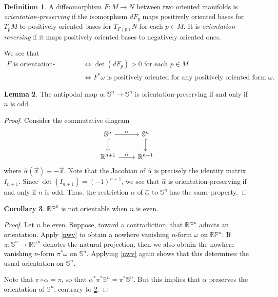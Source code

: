 \documentclass[10pt,letterpaper,cm]{nupset}
\theoremstyle{definition}
\newtheorem{definition}{Definition}[subsection]
\theoremstyle{theorem}
\newtheorem{lemma}[definition]{Lemma}
\newtheorem{corollary}[definition]{Corollary}
\theoremstyle{remark}
\newcommand{\R}{\mathbb R}
\newcommand{\RP}{\mathbb{RP}}
\renewcommand{\S}{\mathbb S}
\newcommand{\1}{\mathbf{1}}
\newcommand{\x}{\vec x}
\newcommand{\0}{\vec 0}
\begin{document}
\begin{definition}
A diffeomorphism $F: M \to N$ between two oriented manifolds is \textit{orientation-preserving} if the isomorphism $dF_p$ maps positively oriented bases for $T_pM$ to positively oriented bases for $T_{F(p)}N$ for each $p\in M$. It is \textit{orientation-reversing} if it maps positively oriented bases to negatively oriented ones.
\end{definition}

We see that 
\begin{align*}
F \text{ is orientation-preserving } & \iff \det(dF_p) >0 \text{ for each }p \in M
\\ &  \iff  F^{\ast}\omega \text{ is positively oriented for any positively oriented form }\omega.
\end{align*}

\begin{lemma}\label{antip}
The antipodal map $\alpha : \S^n \to \S^n$ is orientation-preserving  if and only if $n$ is odd.
\end{lemma}
\begin{proof}
Consider the commutative diagram
\[
\begin{tikzcd}
\S^n \arrow[r, "\alpha"] \arrow[d, hook] & \S^n \arrow[d, hook] \\
\R^{n+1} \arrow[r, "\hat{\alpha}"] & \R^{n+1}
\end{tikzcd}
\]
where $\hat{\alpha}(\x) \equiv {-\x}$. Note that the Jacobian of $\hat{\alpha}$ is precisely the identity matrix $I_{n+1}$. Since $\det(I_{n+1}) = \left({-1}\right)^{n+1}$, we see that $\hat{\alpha}$ is orientation-preserving  if and only if $n$ is odd. Thus, the restriction $\alpha$ of $\hat{\alpha}$ to $\S^n$ has the same property.
\end{proof}

\begin{corollary}\label{RPor}
$\RP^n$ is not orientable when $n$ is even. 
\end{corollary}
\begin{proof}
Let $n$ be even. Suppose, toward a contradiction, that $\RP^n$ admits an orientation. Apply \cref{nwv} to obtain a nowhere vanishing $n$-form $\omega$ on $\RP^n$. If $\pi : \S^n \to \RP^n$ denotes the natural projection, then we also obtain the nowhere vanishing $n$-form $\pi^{\ast}\omega$ on $\S^n$. Applying \cref{nwv} again shows that this determines the usual orientation on $\S^n$. 

Note that $\pi \circ \alpha = \pi$, so that $\alpha^{\ast} \pi^{\ast} \S^n = \pi^{\ast}\S^n$. But this implies that $\alpha$ preserves the orientation of $\S^n$, contrary to \cref{antip}.
\end{proof}
\end{document}
